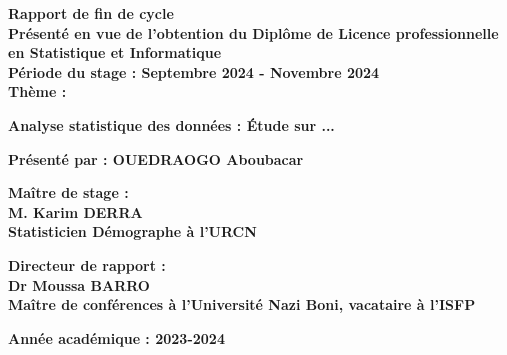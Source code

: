 \documentclass[12pt]{report}
\begin{document}
\begin{titlepage}
			\vspace{1cm} %
			\begin{center}
				\textcolor{black!70}{\textbf{\LARGE Rapport de fin de cycle}}\\[0.3cm]
				
				\textbf{\small Présenté en vue de l'obtention du Diplôme de Licence professionnelle en Statistique et Informatique}\\[0.5cm]
				
				\textbf{\normalsize Période du stage : Septembre 2024 - Novembre 2024}\\[0.5cm]
				
				\textbf{\normalsize Thème : }\\[0.2cm]
				
				\begin{tcolorbox}[colframe=blue, colback=white, rounded corners, boxrule=0.5mm]
					\textbf{\normalsize Analyse statistique des données : Étude sur ...}
				\end{tcolorbox}
				
				\textbf{\normalsize Présenté par : OUEDRAOGO Aboubacar}\\[1cm]
				
			\end{center}
			
			\begin{minipage}{0.45\textwidth} %
				\raggedright
				\textbf{\small Maître de stage :}\\[0.3cm]
				\textbf{\small M. Karim DERRA}\\
				\textbf{\small Statisticien Démographe à l'URCN}
			\end{minipage}
			\hfill
			\begin{minipage}{0.45\textwidth} %
				\raggedleft
				\textbf{\small Directeur de rapport :}\\[0.3cm]
				\textbf{\small Dr Moussa BARRO}\\
				\textbf{\small Maître de conférences à l’Université Nazi Boni, vacataire à l'ISFP}
			\end{minipage}
			
			\vfill
			
			\begin{center}
				\textbf{\normalsize Année académique : 2023-2024}
			\end{center}
		\end{titlepage}
	
\end{document}
